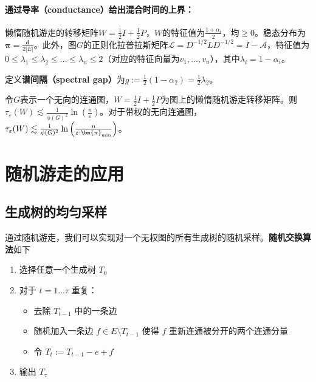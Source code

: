 \documentclass[lang=cn,newtx,10pt,scheme=chinese,chinesefont=nofont,citestyle=gb7714-2015, bibstyle=gb7714-2015]{elegantbook}
\begin{document}
\begin{refsection}
\paragraph{通过导率（conductance）给出混合时间的上界：}
                
                懒惰随机游走的转移矩阵$W=\frac{1}{2}I+\frac{1}{2}P$，$W$的特征值为$\frac{1+\alpha_i}{2}$，均$\ge 0$。稳态分布为$\bm{\pi}=\frac{\bm{d}}{2|E|}$。此外，图$G$的正则化拉普拉斯矩阵$\mathcal{L}=D^{-1/2}LD^{-1/2}=I-\mathcal{A}$，特征值为$0\le\lambda_1\le \lambda_2\le\dots\le \lambda_n\le 2$（对应的特征向量为$v_1,\dots,v_n$），其中$\lambda_i=1-\alpha_i$。

                定义\textbf{谱间隔（spectral gap）}为$g:=\frac{1}{2}(1-\alpha_2)=\frac{1}{2}\lambda_2$。

                \begin{theorem}
                    \label{thrm:mixing-time-g-c}
                    令$G$表示一个无向的连通图，$W=\frac{1}{2}I+\frac{1}{2}P$为图上的懒惰随机游走转移矩阵。则$\tau_{\varepsilon}(W)\lesssim\frac{1}{\phi(G)^2}\ln{\left(\frac{n}{\varepsilon}\right)}$。对于带权的无向连通图，$\tau_{\varepsilon}(W)\lesssim\frac{1}{\phi(G)^2}\ln{\left(\frac{n}{\varepsilon\cdot \bm{\pi}_{\textup{min}}}\right)}$。
                \end{theorem}
            
            
        
\section{随机游走的应用}
\subsection{生成树的均匀采样}
通过随机游走，我们可以实现对一个无权图的所有生成树的随机采样。\textbf{随机交换算法}如下
\begin{enumerate}
    \item 选择任意一个生成树 $T_0$
    \item 对于 $t=1\dots \tau$ 重复：
    \begin{itemize}
        \item 去除 $T_{t-1}$ 中的一条边
        \item 随机加入一条边 $f\in E\setminus T_{t-1}$ 使得 $f$ 重新连通被分开的两个连通分量
        \item 令 $T_t:=T_{t-1}-e+f$
    \end{itemize}
    \item 输出 $T_\tau$
\end{enumerate}


\end{refsection}
\end{document}
